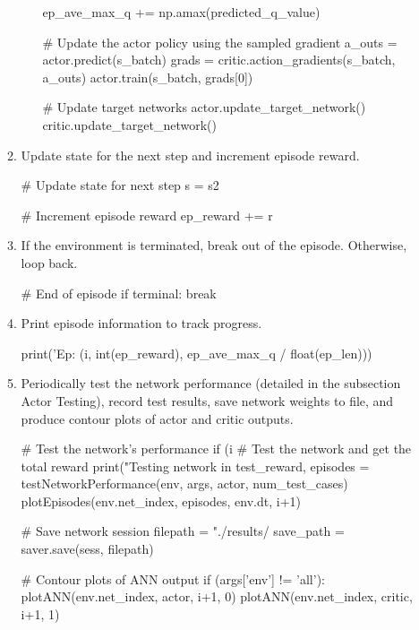 \begin{enumerate}
\begin{enumerate}
\begin{enumerate}
\begin{python}[caption={Network Update},label={list:net_update},xleftmargin=\dimexpr-\csname @totalleftmargin\endcsname]
	ep_ave_max_q += np.amax(predicted_q_value)
	
	# Update the actor policy using the sampled gradient
	a_outs = actor.predict(s_batch)
	grads = critic.action_gradients(s_batch, a_outs)
	actor.train(s_batch, grads[0])
	
	# Update target networks
	actor.update_target_network()
	critic.update_target_network()
		\end{python}	
		\end{enumerate}
	\item Update state for the next step and increment episode reward.
	\begin{python}[caption={Step Cleanup},label={list:ep_clean},xleftmargin=\dimexpr-\csname @totalleftmargin\endcsname]
# Update state for next step
s = s2

# Increment episode reward
ep_reward += r
	\end{python}
	\item If the environment is terminated, break out of the episode. Otherwise, loop back.
	\begin{python}[caption={Episode Termination},label={list:ep_term},xleftmargin=\dimexpr-\csname @totalleftmargin\endcsname]
# End of episode
if terminal:
  	break
	\end{python}
	\item Print episode information to track progress.
	\begin{python}[caption={Print Episode Results},label={list:print_ep},xleftmargin=\dimexpr-\csname @totalleftmargin\endcsname]
print('Ep: %
	(i, int(ep_reward), ep_ave_max_q / float(ep_len)))
	\end{python}
	\item Periodically test the network performance (detailed in the subsection Actor Testing), record test results, save network weights to file, and produce contour plots of actor and critic outputs.
	\begin{python}[caption={Network Evaluation},label={list:net_eval},xleftmargin=\dimexpr-\csname @totalleftmargin\endcsname]
# Test the network's performance
if (i %
    # Test the network and get the total reward
    print("Testing network in %
    test_reward, episodes = testNetworkPerformance(env, args, actor, num_test_cases)
    plotEpisodes(env.net_index, episodes, env.dt, i+1)

    # Save network session
    filepath = "./results/%
    save_path = saver.save(sess, filepath)

    # Contour plots of ANN output
    if (args['env'] != 'all'):
        plotANN(env.net_index, actor, i+1, 0)
        plotANN(env.net_index, critic, i+1, 1)
	\end{python}	
	\end{enumerate}
\end{enumerate}

